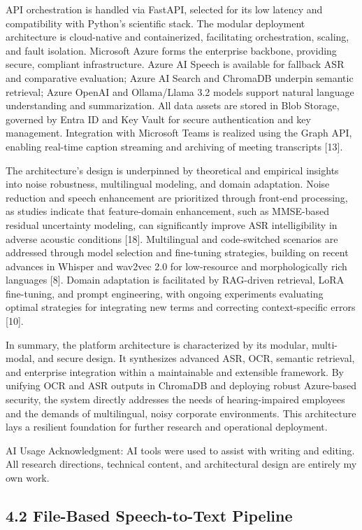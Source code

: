 \documentclass[12pt,a4paper]{article}
\begin{document}
API orchestration is handled via FastAPI, selected for its low latency and compatibility with Python’s scientific stack. The modular deployment architecture is cloud-native and containerized, facilitating orchestration, scaling, and fault isolation. Microsoft Azure forms the enterprise backbone, providing secure, compliant infrastructure. Azure AI Speech is available for fallback ASR and comparative evaluation; Azure AI Search and ChromaDB underpin semantic retrieval; Azure OpenAI and Ollama/Llama 3.2 models support natural language understanding and summarization. All data assets are stored in Blob Storage, governed by Entra ID and Key Vault for secure authentication and key management. Integration with Microsoft Teams is realized using the Graph API, enabling real-time caption streaming and archiving of meeting transcripts [13].


The architecture’s design is underpinned by theoretical and empirical insights into noise robustness, multilingual modeling, and domain adaptation. Noise reduction and speech enhancement are prioritized through front-end processing, as studies indicate that feature-domain enhancement, such as MMSE-based residual uncertainty modeling, can significantly improve ASR intelligibility in adverse acoustic conditions [18]. Multilingual and code-switched scenarios are addressed through model selection and fine-tuning strategies, building on recent advances in Whisper and wav2vec 2.0 for low-resource and morphologically rich languages [8]. Domain adaptation is facilitated by RAG-driven retrieval, LoRA fine-tuning, and prompt engineering, with ongoing experiments evaluating optimal strategies for integrating new terms and correcting context-specific errors [10].


In summary, the platform architecture is characterized by its modular, multi-modal, and secure design. It synthesizes advanced ASR, OCR, semantic retrieval, and enterprise integration within a maintainable and extensible framework. By unifying OCR and ASR outputs in ChromaDB and deploying robust Azure-based security, the system directly addresses the needs of hearing-impaired employees and the demands of multilingual, noisy corporate environments. This architecture lays a resilient foundation for further research and operational deployment.


AI Usage Acknowledgment: AI tools were used to assist with writing and editing. All research directions, technical content, and architectural design are entirely my own work.


\subsection{4.2 File-Based Speech-to-Text Pipeline}
\end{document}
